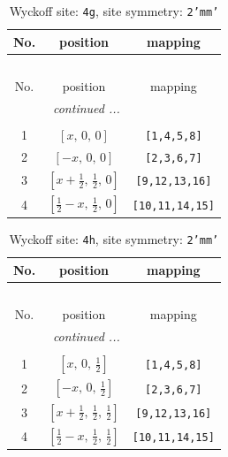 \documentclass[fleqn,8pt]{jsarticle}
\begin{document}
\renewcommand{\arraystretch}{1.2}
\begin{longtable}{ccc}
\caption{Wyckoff site: {\tt 4g}, site symmetry: {\tt 2'mm'}}
 \\
 \hline \hline
No. & position & mapping \\ \hline \endfirsthead

\multicolumn{2}{l}{\tablename\ \thetable{}} \\
 \hline \hline
No. & position & mapping \\ \hline \endhead

 \hline \hline
\multicolumn{2}{r}{\footnotesize\it continued ...} \\ \endfoot

 \hline \hline
\multicolumn{2}{r}{} \\ \endlastfoot

1 & $\left[ x,\, 0,\, 0 \right]$ & {\tt [1,4,5,8]} \\ \hline
2 & $\left[ - x,\, 0,\, 0 \right]$ & {\tt [2,3,6,7]} \\ \hline
3 & $\left[ x + \frac{1}{2},\, \frac{1}{2},\, 0 \right]$ & {\tt [9,12,13,16]} \\ \hline
4 & $\left[ \frac{1}{2} - x,\, \frac{1}{2},\, 0 \right]$ & {\tt [10,11,14,15]} \\
\end{longtable}
\renewcommand{\arraystretch}{1.2}
\begin{longtable}{ccc}
\caption{Wyckoff site: {\tt 4h}, site symmetry: {\tt 2'mm'}}
 \\
 \hline \hline
No. & position & mapping \\ \hline \endfirsthead

\multicolumn{2}{l}{\tablename\ \thetable{}} \\
 \hline \hline
No. & position & mapping \\ \hline \endhead

 \hline \hline
\multicolumn{2}{r}{\footnotesize\it continued ...} \\ \endfoot

 \hline \hline
\multicolumn{2}{r}{} \\ \endlastfoot

1 & $\left[ x,\, 0,\, \frac{1}{2} \right]$ & {\tt [1,4,5,8]} \\ \hline
2 & $\left[ - x,\, 0,\, \frac{1}{2} \right]$ & {\tt [2,3,6,7]} \\ \hline
3 & $\left[ x + \frac{1}{2},\, \frac{1}{2},\, \frac{1}{2} \right]$ & {\tt [9,12,13,16]} \\ \hline
4 & $\left[ \frac{1}{2} - x,\, \frac{1}{2},\, \frac{1}{2} \right]$ & {\tt [10,11,14,15]} \\
\end{longtable}
\end{document}

